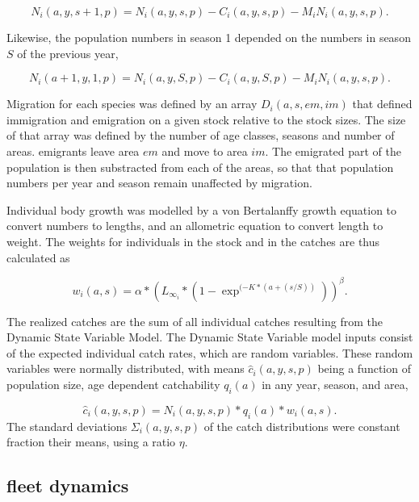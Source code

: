 \documentclass[12pt,oneline,a4paper,numbib]{ouparticle}
\numberwithin{equation}{subsection} %
\begin{document}
\begin{equation}
N_i (a, y, s+1, p) = N_i (a, y, s, p) - C_i (a, y, s, p) - M_i N_i (a, y, s, p) . 
\end{equation}

Likewise, the population numbers in season 1 depended on the numbers in season $S$ of the previous year,

\begin{equation}
N_i (a+1, y, 1, p) = N_i (a, y, S, p) - C_i (a, y, S, p) - M_i N_i (a, y, s, p). 
\end{equation}

Migration for each species was defined by an array $D_i (a, s, em, im)$ that defined  immigration and emigration on a given stock relative to the stock sizes. The size of that array was defined by the number of age classes, seasons and number of areas. emigrants leave area $em$ and move to area $im$. The emigrated part of the population is then substracted from each of the areas, so that that population numbers per year and season remain unaffected by migration.   

Individual body growth was modelled by a von Bertalanffy growth equation to convert numbers to lengths, and an allometric equation to convert length to weight. The weights for individuals in the stock and in the catches are thus calculated as

\begin{equation}
w_i(a,s) =  \alpha * ( L_{\infty_i} * (1-\exp^{(-K * (a+(s/S))}))^{\beta}.
\end{equation}

The realized catches are the sum of all individual catches resulting from the Dynamic State Variable Model. The Dynamic State Variable model inputs consist of the expected individual catch rates, which are random variables. These random variables were normally distributed, with means $\hat c_i (a, y, s, p)$ being a function of population size, age dependent catchability $q_i (a)$ in any year, season, and area,  

\begin{equation}
\hat c_i (a, y, s, p) = N_i (a, y, s, p) * q_i (a)  * w_i(a,s).
\end{equation}
The standard deviations $\Sigma_i (a, y, s, p)$ of the catch distributions were constant fraction  their means, using a ratio $\eta$. 

\subsection{fleet dynamics}
\label{sec2.2}
\end{document}
